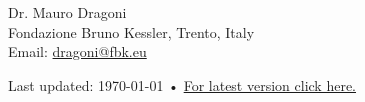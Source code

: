 \documentclass[10pt, a4paper]{article}
\begin{document}
Dr. Mauro Dragoni \\
Fondazione Bruno Kessler, Trento, Italy\\
Email: \href{mailto: dragoni@fbk.eu}{dragoni@fbk.eu} 





\vfill{}

\begin{center}
{\scriptsize  Last updated: \today\- •\- 
\href{https://countinglogic.github.io/research/CV/CV.pdf}{For latest version click here. }}
\end{center}
\end{document}
